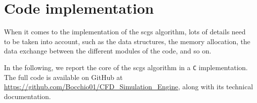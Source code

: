 \section{Code implementation}
\label{sec:code_implementation}

When it comes to the implementation of the \acrshort{scgs} algorithm, lots of details need to be taken into account, such as the data structures, the memory allocation, the data exchange between the different modules of the code, and so on.

In the following, we report the core of the \acrshort{scgs} algorithm in a \texttt{C} implementation.
The full code is available on GitHub at \url{https://github.com/Bocchio01/CFD_Simulation_Engine}, along with its technical documentation.





